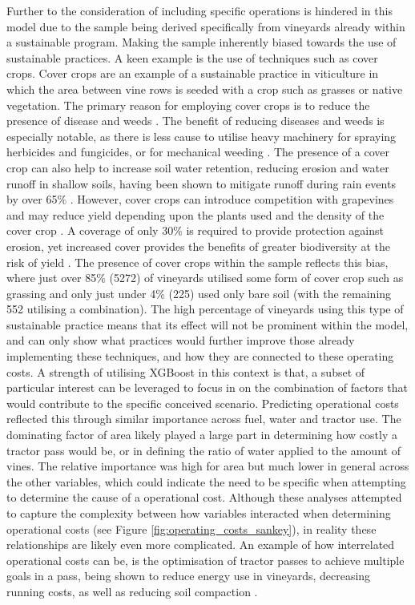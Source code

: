 \documentclass[review,12pt,authoryear]{elsarticle}
\begin{document}
\begin{linenumbers}
Further to the consideration of including specific operations is hindered in this model due to the sample being derived specifically from vineyards already within a sustainable program. Making the sample inherently biased towards the use of sustainable practices. A keen example is the use of techniques such as cover crops. Cover crops are an example of a sustainable practice in viticulture in which the area between vine rows is seeded with a crop such as grasses or native vegetation. The primary reason for employing cover crops is to reduce the presence of disease and weeds \citep{delpuechAdaptingCoverCrop2018}. The benefit of reducing diseases and weeds is especially notable, as there is less cause to utilise heavy machinery for spraying herbicides and fungicides, or for mechanical weeding \citep{capelloEffectsTractorPasses2019}. The presence of a cover crop can also help to increase soil water retention, reducing erosion and water runoff in shallow soils, having been shown to mitigate runoff during rain events by over 65\% \citep{capelloPermanentCoverSoil2020}. However, cover crops can introduce competition with grapevines and may reduce yield depending upon the plants used and the density of the cover crop \citep{capelloEffectsTractorPasses2019,delpuechAdaptingCoverCrop2018,goslingLongTermChangesSoil2005,monteiroInfluenceCoverCrop2007}. A coverage of only 30\% is required to provide protection against erosion, yet increased cover provides the benefits of greater biodiversity at the risk of yield \citep{delpuechAdaptingCoverCrop2018}. The presence of cover crops within the sample reflects this bias, where just over 85\% (5272) of vineyards utilised some form of cover crop such as grassing and only just under 4\% (225) used only bare soil (with the remaining 552 utilising a combination). The high percentage of vineyards using this type of sustainable practice means that its effect will not be prominent within the model, and can only show what practices would further improve those already implementing these techniques, and how they are connected to these operating costs. A strength of utilising XGBoost in this context is that, a subset of particular interest can be leveraged to focus in on the combination of factors that would contribute to the specific conceived scenario. Predicting operational costs reflected this through similar importance across fuel, water and tractor use. The dominating factor of area likely played a large part in determining how costly a tractor pass would be, or in defining the ratio of water applied to the amount of vines. The relative importance was high for area but much lower in general across the other variables, which could indicate the need to be specific when attempting to determine the cause of a operational cost. Although these analyses attempted to capture the complexity between how variables interacted when determining operational costs (see Figure \ref{fig:operating_costs_sankey}), in reality these relationships are likely even more complicated. An example of how interrelated operational costs can be, is the optimisation of tractor passes to achieve multiple goals in a pass, being shown to reduce energy use in vineyards, decreasing running costs, as well as reducing soil compaction \citep{capelloEffectsTractorPasses2019}. 

\end{linenumbers}
\end{document}
